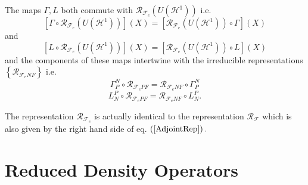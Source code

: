 \documentclass[aps,preprint]{revtex4}%
\begin{document}
The maps $\Gamma,L$ both commute with $\mathcal{R}_{\mathcal{F}_{e}}\left(
U\left(  \mathcal{H}^{1}\right)  \right)  $ i.e.
\begin{equation}
\left[  \Gamma\circ\mathcal{R}_{\mathcal{F}_{e}}\left(  U\left(
\mathcal{H}^{1}\right)  \right)  \right]  \left(  X\right)  =\left[
\mathcal{R}_{\mathcal{F}_{e}}\left(  U\left(  \mathcal{H}^{1}\right)  \right)
\circ\Gamma\right]  \left(  X\right)
\end{equation}
and
\begin{equation}
\left[  L\circ\mathcal{R}_{\mathcal{F}_{e}}\left(  U\left(  \mathcal{H}%
^{1}\right)  \right)  \right]  \left(  X\right)  =\left[  \mathcal{R}%
_{\mathcal{F}_{e}}\left(  U\left(  \mathcal{H}^{1}\right)  \right)  \circ
L\right]  \left(  X\right)
\end{equation}
and the components of these maps intertwine with the irreducible
representations $\left\{  \mathcal{R}_{\mathcal{F}_{e}NF}\right\}  $ i.e.
\begin{equation}
\Gamma_{P}^{N}\circ\mathcal{R}_{\mathcal{F}_{e}PF}=\mathcal{R}_{\mathcal{F}%
_{e}NF}\circ\Gamma_{P}^{N}%
\end{equation}%
\begin{equation}
L_{N}^{P}\circ\mathcal{R}_{\mathcal{F}_{e}PF}=\mathcal{R}_{\mathcal{F}_{e}%
NF}\circ L_{N}^{P}.
\end{equation}


The representation $\mathcal{R}_{\mathcal{F}_{e}}$ is actually identical to
the representation $\mathcal{R}_{\mathcal{F}}$ which is also given by the
right hand side of eq. $\left(  \ref{AdjointRep}\right)  .$

\section{Reduced Density Operators \label{Reduced Density Operators}}
\end{document}
